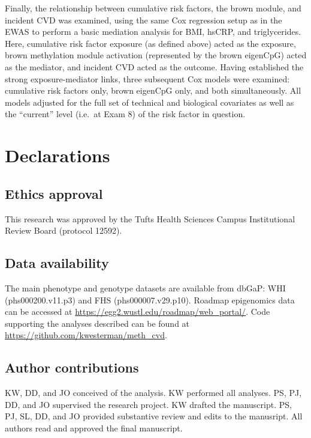 \documentclass[]{article}
\theoremstyle{definition}
\theoremstyle{definition}
\theoremstyle{definition}
\theoremstyle{remark}
\begin{document}
Finally, the relationship between cumulative risk factors, the brown
module, and incident CVD was examined, using the same Cox regression
setup as in the EWAS to perform a basic mediation analysis for BMI,
hsCRP, and triglycerides. Here, cumulative risk factor exposure (as
defined above) acted as the exposure, brown methylation module
activation (represented by the brown eigenCpG) acted as the mediator,
and incident CVD acted as the outcome. Having established the strong
exposure-mediator links, three subsequent Cox models were examined:
cumulative risk factors only, brown eigenCpG only, and both
simultaneously. All models adjusted for the full set of technical and
biological covariates as well as the ``current'' level (i.e.~at Exam 8)
of the risk factor in question.

\section{Declarations}\label{declarations}

\subsection{Ethics approval}\label{ethics-approval}

This research was approved by the Tufts Health Sciences Campus
Institutional Review Board (protocol 12592).

\subsection{Data availability}\label{data-availability}

The main phenotype and genotype datasets are available from dbGaP: WHI
(phs000200.v11.p3) and FHS (phs000007.v29.p10). Roadmap epigenomics data
can be accessed at \url{https://egg2.wustl.edu/roadmap/web_portal/}.
Code supporting the analyses described can be found at
\url{https://github.com/kwesterman/meth_cvd}.

\subsection{Author contributions}\label{author-contributions}

KW, DD, and JO conceived of the analysis. KW performed all analyses. PS,
PJ, DD, and JO supervised the research project. KW drafted the
manuscript. PS, PJ, SL, DD, and JO provided substantive review and edits
to the manusript. All authors read and approved the final manuscript.
\end{document}
